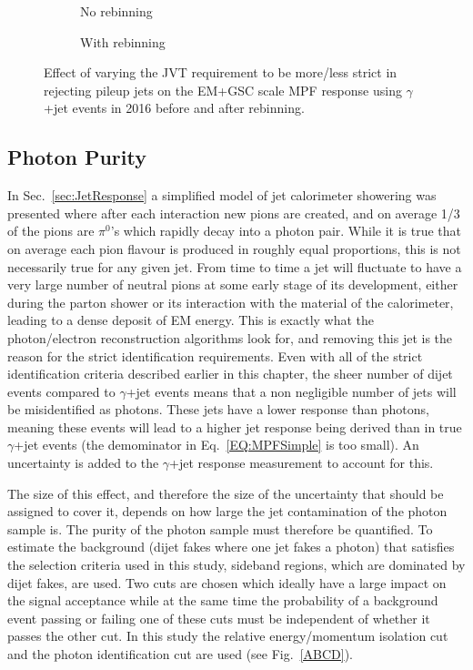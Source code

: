 \begin{figure}[!ht]
\centering
\begin{subfigure}{.5\textwidth}
\centering
{}
\caption{No rebinning}
\end{subfigure}%
\begin{subfigure}{.5\textwidth}  \centering
{}
\caption{With rebinning}
\end{subfigure}
\caption{Effect of varying the JVT requirement to be more/less strict in rejecting pileup jets on the EM+GSC scale MPF response using $\gamma$+jet events in 2016 before and after rebinning. }
\label{Fig:GJetJVTEM2016}
\end{figure}

\subsection{Photon Purity}

In Sec.~\ref{sec:JetResponse} a simplified model of jet calorimeter showering was presented where after each interaction new pions are created, and on average 1/3 of the pions are $\pi^0$'s which rapidly decay into a photon pair.  
While it is true that on average each pion flavour is produced in roughly equal proportions, this is not necessarily true for any given jet.  
From time to time a jet will fluctuate to have a very large number of neutral pions at some early stage of its development, either during the parton shower or its interaction with the material of the calorimeter, leading to a dense deposit of EM energy.  
This is exactly what the photon/electron reconstruction algorithms look for, and removing this jet is the reason for the strict identification requirements.  
Even with all of the strict identification criteria described earlier in this chapter, the sheer number of dijet events compared to $\gamma$+jet events means that a non negligible number of jets will be misidentified as photons.  
These jets have a lower response than photons, meaning these events will lead to a higher jet response being derived than in true $\gamma$+jet events (the demominator in Eq.~\ref{EQ:MPFSimple} is too small).  
An uncertainty is added to the $\gamma$+jet response measurement to account for this.  

The size of this effect, and therefore the size of the uncertainty that should be assigned to cover it, depends on how large the jet contamination of the photon sample is.  
The purity of the photon sample must therefore be quantified.  
To estimate the background (dijet fakes where one jet fakes a photon) that  satisfies the selection criteria used in this study, sideband regions, which are dominated by dijet fakes, are used.  
Two cuts are chosen which ideally have a large impact on the signal acceptance while at the same time the probability of a background event passing or failing one of these cuts must be independent of whether it passes the other cut.  
In this study the relative energy/momentum isolation cut and the photon identification cut are used (see Fig.~\ref{ABCD}).  

